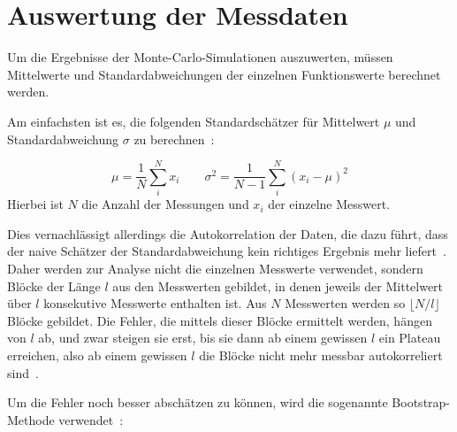 	
	\section{Auswertung der Messdaten}
	\label{sec:theorieauswertung}
	Um die Ergebnisse der Monte-Carlo-Simulationen auszuwerten, müssen Mittelwerte und Standardabweichungen der einzelnen Funktionswerte berechnet werden.
	
	Am einfachsten ist es, die folgenden Standardschätzer für Mittelwert $\mu$ und Standardabweichung $\sigma$ zu berechnen~\cite[vgl. ][S. 54 f.]{skriptcompphys}:
	
	\begin{equation}
	\mu=\frac{1}{N}\sum\limits_{i}^{N} x_i
	\qquad
	\sigma^2=\frac{1}{N-1}\sum\limits_{i}^{N}(x_i-\mu)^2
	\label{eq:standardmitteundfehler}
	\end{equation}
	Hierbei ist $N$ die Anzahl der Messungen und $x_i$ der einzelne Messwert.
	
	
	
	Dies vernachlässigt allerdings die Autokorrelation der Daten, die dazu führt, dass der naive Schätzer der Standardabweichung kein richtiges Ergebnis mehr liefert~\cite[vgl. ][S. 72 ff.]{skriptcompphys}. Daher werden zur Analyse nicht die einzelnen Messwerte verwendet, sondern Blöcke der Länge $l$ aus den Messwerten gebildet, in denen jeweils der Mittelwert über $l$ konsekutive Messwerte enthalten ist. Aus $N$ Messwerten werden so $\lfloor N/l \rfloor$ Blöcke gebildet. Die Fehler, die mittels dieser Blöcke ermittelt werden, hängen von $l$ ab, und zwar steigen sie erst, bis sie dann ab einem gewissen $l$ ein Plateau erreichen, also ab einem gewissen $l$ die Blöcke nicht mehr messbar autokorreliert sind~\cite[vgl. ][S. 75 ff.]{skriptcompphys}.
	
	
	
	
	Um die Fehler noch besser abschätzen zu können, wird die sogenannte Bootstrap-Methode verwendet~\cite[vgl. ][S. 64 ff.]{skriptcompphys}:
	
